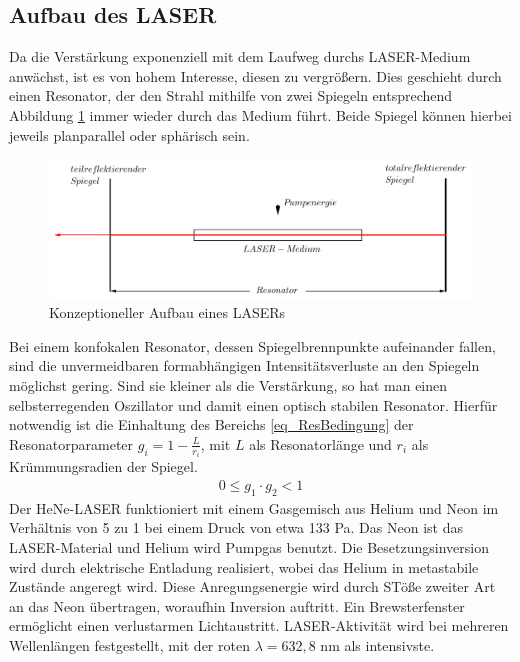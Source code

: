 \subsection{Aufbau des LASER}
Da die Verstärkung exponenziell mit dem Laufweg durchs LASER-Medium anwächst, ist es von hohem Interesse, diesen zu vergrößern. Dies geschieht durch
einen Resonator, der den Strahl mithilfe von zwei Spiegeln entsprechend Abbildung \ref{pic_Res} immer wieder durch das Medium führt. Beide Spiegel
können hierbei jeweils planparallel oder sphärisch sein. 
\begin{figure}[H]
\includegraphics[width=\textwidth]{../pics/Res.png}
\caption{Konzeptioneller Aufbau eines LASERs}
\label{pic_Res}
\end{figure}
Bei einem konfokalen Resonator, dessen Spiegelbrennpunkte aufeinander fallen, sind die
unvermeidbaren formabhängigen Intensitätsverluste an den Spiegeln möglichst gering. Sind sie kleiner als die Verstärkung, so hat man einen selbsterregenden Oszillator
und damit einen optisch stabilen Resonator. Hierfür notwendig ist die Einhaltung des Bereichs \eqref{eq_ResBedingung} der Resonatorparameter $g_i = 1- \frac{L}{r_i}$, mit $L$ 
als Resonatorlänge und $r_i$ als Krümmungsradien der Spiegel.
\begin{align}
 0 \le g_1 \cdot g_2 < 1
 \label{eq_ResBedingung}
\end{align}
Der HeNe-LASER funktioniert mit einem Gasgemisch aus Helium und Neon im Verhältnis von 5 zu 1 bei einem Druck von etwa 133 Pa. Das Neon ist das 
LASER-Material und Helium wird Pumpgas benutzt. Die Besetzungsinversion wird durch elektrische Entladung realisiert, wobei das Helium in
metastabile Zustände angeregt wird. Diese Anregungsenergie wird durch STöße zweiter Art an das Neon übertragen, woraufhin Inversion auftritt. 
Ein Brewsterfenster ermöglicht einen verlustarmen Lichtaustritt. LASER-Aktivität wird bei mehreren Wellenlängen festgestellt, mit der roten $\lambda = 632,8$ nm
als intensivste.

